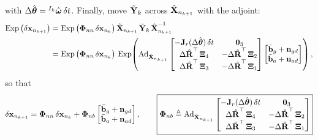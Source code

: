 with $\Delta\hat{\vect{\theta}} = {}^{I_k}\hat{\vect{\omega}}\,\delta t$. Finally, move $\tilde{\vect{Y}}_k$ across $\hat{\vect{X}}_{n_{k+1}}$ with the adjoint:
\begin{align}
\Exp\big(\delta\vect{x}_{n_{k+1}}\big)
&= \Exp\big(\vect{\Phi}_{nn}\,\delta\vect{x}_{n_k}\big)\,\hat{\vect{X}}_{n_{k+1}}\,\tilde{\vect{Y}}_k\,\hat{\vect{X}}_{n_{k+1}}^{-1} \\
&= \Exp\big(\vect{\Phi}_{nn}\,\delta\vect{x}_{n_k}\big)\,\Exp\!\left(\Ad_{\hat{\vect{X}}_{n_{k+1}}}
\begin{bmatrix} -\vect{J}_r(\Delta\hat{\vect{\theta}})\,\delta t & \vect{0}_3 \\ \Delta\hat{\vect{R}}\trans\,\vect{\Xi}_4 & -\Delta\hat{\vect{R}}\trans\,\vect{\Xi}_2 \\ \Delta\hat{\vect{R}}\trans\,\vect{\Xi}_3 & -\Delta\hat{\vect{R}}\trans\,\vect{\Xi}_1 \end{bmatrix}
\begin{bmatrix} \tilde{\vect{b}}_g + \vect{n}_{gd} \\ \tilde{\vect{b}}_a + \vect{n}_{ad} \end{bmatrix}\right),
\end{align}
so that
\begin{align}
\delta\vect{x}_{n_{k+1}} = \vect{\Phi}_{nn}\,\delta\vect{x}_{n_k} + \vect{\Phi}_{nb}\begin{bmatrix} \tilde{\vect{b}}_g + \vect{n}_{gd} \\ \tilde{\vect{b}}_a + \vect{n}_{ad} \end{bmatrix},
\qquad
\boxed{\vect{\Phi}_{nb} \triangleq \Ad_{\hat{\vect{X}}_{n_{k+1}}}
\begin{bmatrix} -\vect{J}_r(\Delta\hat{\vect{\theta}})\,\delta t & \vect{0}_3 \\ \Delta\hat{\vect{R}}\trans\,\vect{\Xi}_4 & -\Delta\hat{\vect{R}}\trans\,\vect{\Xi}_2 \\ \Delta\hat{\vect{R}}\trans\,\vect{\Xi}_3 & -\Delta\hat{\vect{R}}\trans\,\vect{\Xi}_1 \end{bmatrix}}
\end{align}

